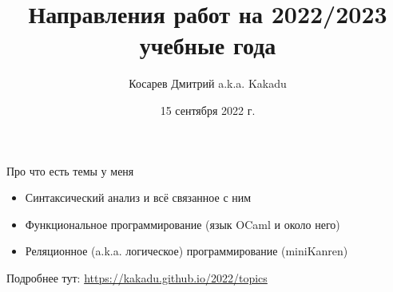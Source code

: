 \documentclass[aspectratio=169
  , xcolor={svgnames}
  , hyperref=
      { colorlinks
      , urlcolor=DarkBlue
      }
  , 12pt
  , russian  %
  ]{beamer}
\title{Направления работ на 2022/2023 учебные года}
\author[Косарев Дмитрий]{Косарев Дмитрий a.k.a. Kakadu}
\date{15 сентября 2022 г.}
\begin{document}
\maketitle


\everymath{\displaystyle}

\begin{frame}{Про что есть темы у меня}
\begin{itemize}
\item [\faGood] Синтаксический анализ и всё связанное с ним
\item [\faGood] Функциональное программирование (язык OCaml и около него)
\item [\faGood] Реляционное (a.k.a. логическое) программирование (miniKanren)
\end{itemize}
\vspace{3em}


Подробнее тут: \href{https://kakadu.github.io/2022/topics}{https://kakadu.github.io/2022/topics}
\end{frame}
\end{document}
